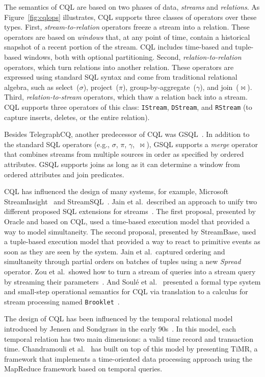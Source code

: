 The semantics of CQL are
based on two phases of data, \emph{streams} and \emph{relations}.
As Figure~\ref{fig:cqlops} illustrates, CQL
supports three classes of operators over these types. First,
\emph{stream-to-relation} operators freeze a stream into a relation.
These operators are based on
\emph{windows} that, at any point of time, contain a
historical snapshot of a recent portion of the stream. CQL includes
time-based and tuple-based windows, both with optional
partitioning. Second, \emph{relation-to-relation} operators, which
turn relations into another relation. These operators are expressed
using standard SQL syntax and come from traditional relational
algebra, such as select~($\sigma$), project~($\pi$),
group-by-aggregate~($\gamma$), and join~($\bowtie$).
Third, \emph{rela\-tion-to-stream} operators, which thaw a relation
back into a stream. CQL supports three operators of this class:
\texttt{IStream}, \texttt{DStream}, and \texttt{RStream} (to capture inserts, deletes, or the entire
relation).

Besides TelegraphCQ, another predecessor of CQL was
\textsf{GSQL}~\cite{cranor_et_al_2003}.  In addition to the standard SQL
operators (e.g., $\sigma$, $\pi$, $\gamma$,~$\bowtie$), GSQL supports
a \emph{merge} operator that combines streams from multiple sources in
order as specified by ordered attributes.  GSQL supports joins as long
as it can determine a window from ordered attributes and join predicates.

CQL has influenced the design of many systems, for example, \textsf{Microsoft
StreamInsight}~\cite{ali_et_al_2009} and \textsf{StreamSQL}~\cite{StreamSQL}.  Jain et al.\ described an
approach to unify two different proposed SQL extensions for
streams~\cite{jain_et_al_2008}. The first proposal, presented by
Oracle and based on CQL, used a time-based execution model that
provided a way to model simultaneity. The second proposal, presented
by \textsf{StreamBase}, used a tuple-based execution model that provided a way
to react to primitive events as soon as they are seen by the system.
Jain et al.\ captured ordering and simultaneity through partial orders
on batches of tuples using a new \emph{Spread} operator.  Zou et
al.\ showed how to turn a stream of queries into a stream query by
streaming their parameters~\cite{zou_et_al_2010}.  And Soul\'{e} et
al.~\cite{soule_et_al_2016} presented a formal type system and
small-step operational semantics for CQL via translation to a calculus
for stream processing named \texttt{Brooklet}~\cite{soule_et_al_2010}.

The design of CQL has been influenced by the temporal relational model introduced by Jensen and Sondgrass in  the early 90s~\cite{jensen1994temporal}. In this model, each temporal relation has two main dimensions: a valid time record and transaction time. Chandramouli et al.~\cite{chandramouli2012temporal} has built on top of this model by presenting \textsf{TiMR}, a framework that implements a time-oriented data processing approach using the MapReduce framework based on temporal queries.

